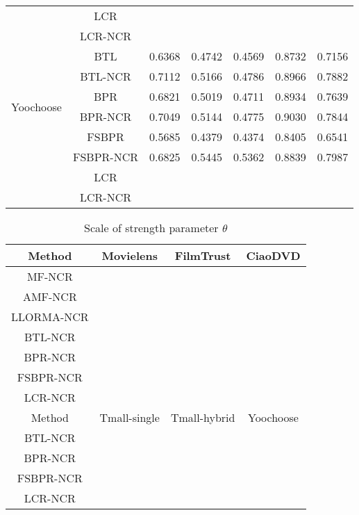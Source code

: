 \documentclass[letterpaper]{article} %
\begin{document}
\begin{table}[htp]
\begin{center}
\begin{tabular}{|c|c|c|c|c|c|c|}
   & LCR & & & & & \\\cline{2-7}
 & LCR-NCR & & & & & \\\hline
\multirow{6}{*}{Yoochoose} & BTL &0.6368 &0.4742 &0.4569 &0.8732 &0.7156 \\\cline{2-7}
 & BTL-NCR &0.7112 &0.5166 &0.4786 &0.8966 &0.7882 \\\cline{2-7}
 & BPR &0.6821 &0.5019 &0.4711 &0.8934 &0.7639 \\\cline{2-7}
 & BPR-NCR &0.7049 &0.5144 &0.4775 &0.9030 &0.7844 \\\cline{2-7}
 & FSBPR &0.5685 &0.4379 &0.4374 &0.8405 &0.6541\\\cline{2-7}
  & FSBPR-NCR &0.6825 &0.5445 &0.5362 &0.8839 &0.7987  \\\cline{2-7}
   & LCR & & & & & \\\cline{2-7}
 & LCR-NCR & & & & & \\\hline
\end{tabular}
\end{center}
\label{tab:ratingresult}
\end{table}%


\begin{table}[htp]
\caption{Scale of strength parameter $\theta$}
\begin{center}
\begin{tabular}{|c|c|c|c|}
\hline
Method & Movielens & FilmTrust & CiaoDVD \\\hline
MF-NCR & & & \\\hline
AMF-NCR & & & \\\hline
LLORMA-NCR & & & \\\hline
BTL-NCR & & & \\\hline
BPR-NCR & & & \\\hline
FSBPR-NCR & & & \\\hline
LCR-NCR & & & \\\hline
Method & Tmall-single & Tmall-hybrid & Yoochoose \\\hline
BTL-NCR & & & \\\hline
BPR-NCR & & & \\\hline
FSBPR-NCR & & & \\\hline
LCR-NCR & & & \\\hline
\end{tabular}
\end{center}
\label{tab:theta}
\end{table}%
\end{document}
